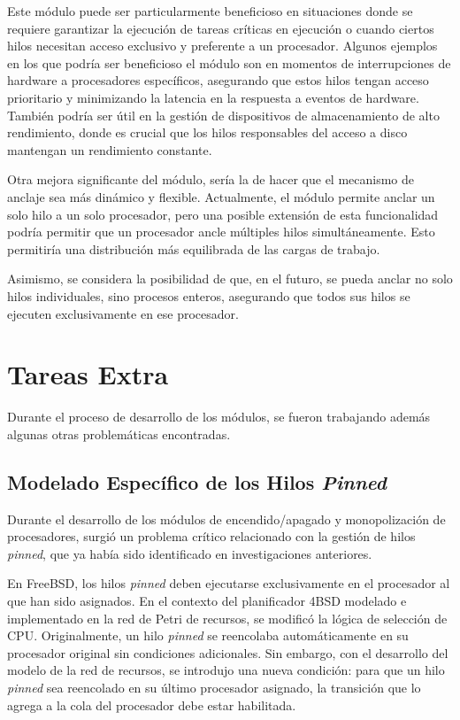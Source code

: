 Este módulo puede ser particularmente beneficioso en situaciones donde se requiere garantizar la ejecución de tareas críticas en ejecución o cuando ciertos hilos necesitan acceso exclusivo y preferente a un procesador. Algunos ejemplos en los que podría ser beneficioso el módulo son en momentos de interrupciones de hardware a procesadores específicos, asegurando que estos hilos tengan acceso prioritario y minimizando la latencia en la respuesta a eventos de hardware. También podría ser útil en la gestión de dispositivos de almacenamiento de alto rendimiento, donde es crucial que los hilos responsables del acceso a disco mantengan un rendimiento constante.\par

Otra mejora significante del módulo, sería la de hacer que el mecanismo de anclaje sea más dinámico y flexible. Actualmente, el módulo permite anclar un solo hilo a un solo procesador, pero una posible extensión de esta funcionalidad podría permitir que un procesador ancle múltiples hilos simultáneamente. Esto permitiría una distribución más equilibrada de las cargas de trabajo.\par

Asimismo, se considera la posibilidad de que, en el futuro, se pueda anclar no solo hilos individuales, sino procesos enteros, asegurando que todos sus hilos se ejecuten exclusivamente en ese procesador.\par

\section{Tareas Extra}

Durante el proceso de desarrollo de los módulos, se fueron trabajando además algunas otras problemáticas encontradas.\par

\subsection{Modelado Específico de los Hilos \textit{Pinned}}

Durante el desarrollo de los módulos de encendido/apagado y monopolización de procesadores, surgió un problema crítico relacionado con la gestión de hilos \textit{pinned}, que ya había sido identificado en investigaciones anteriores.\par

En FreeBSD, los hilos \textit{pinned} deben ejecutarse exclusivamente en el procesador al que han sido asignados. En el contexto del planificador 4BSD modelado e implementado en la red de Petri de recursos, se modificó la lógica de selección de CPU. Originalmente, un hilo \textit{pinned} se reencolaba automáticamente en su procesador original sin condiciones adicionales. Sin embargo, con el desarrollo del modelo de la red de recursos, se introdujo una nueva condición: para que un hilo \textit{pinned} sea reencolado en su último procesador asignado, la transición que lo agrega a la cola del procesador debe estar habilitada.\par

